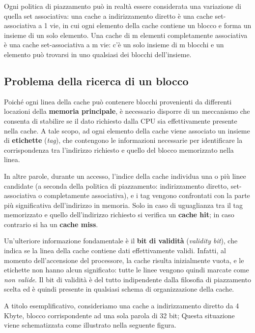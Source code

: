 Ogni politica di piazzamento può in realtà essere considerata una variazione di quella set
associativa: una cache a indirizzamento diretto è una cache set-associativa a 1 vie, in cui ogni elemento della cache contiene un blocco e forma un insieme di un solo elemento. Una cache di m elementi completamente associativa è una cache set-associativa a m vie: c'è un
solo insieme di m blocchi e un elemento può trovarsi in uno qualsiasi dei blocchi dell'insieme.

\subsection{Problema della ricerca di un blocco}
Poiché ogni linea della cache può contenere blocchi provenienti da differenti locazioni della \textbf{memoria principale}, è necessario disporre di un meccanismo che consenta di stabilire se il dato richiesto dalla CPU sia effettivamente presente nella cache. A tale scopo, ad ogni elemento della cache viene associato un insieme di \textbf{etichette} (\textit{tag}), che contengono le informazioni necessarie per identificare la corrispondenza tra l'indirizzo richiesto e quello del blocco memorizzato nella linea.  

In altre parole, durante un accesso, l'indice della cache individua una o più linee candidate (a seconda della politica di piazzamento: indirizzamento diretto, set-associativa o completamente associativa), e i tag vengono confrontati con la parte più significativa dell'indirizzo in memoria. Solo in caso di uguaglianza tra il tag memorizzato e quello dell'indirizzo richiesto si verifica un \textbf{cache hit}; in caso contrario si ha un \textbf{cache miss}.  

Un'ulteriore informazione fondamentale è il \textbf{bit di validità} (\textit{validity bit}), che indica se la linea della cache contiene dati effettivamente validi. Infatti, al momento dell'accensione del processore, la cache risulta inizialmente vuota, e le etichette non hanno alcun significato: tutte le linee vengono quindi marcate come \textit{non valide}. Il bit di validità è del tutto indipendente dalla filosofia di piazzamento scelta ed è quindi presente in qualsiasi schema di organizzazione della cache.  


\noindent A titolo esemplificativo, consideriamo una cache a indirizzamento diretto da 4 Kbyte, blocco corrispondente ad una sola parola di 32 bit; Questa situazione viene schematizzata come illustrato nella seguente figura.

